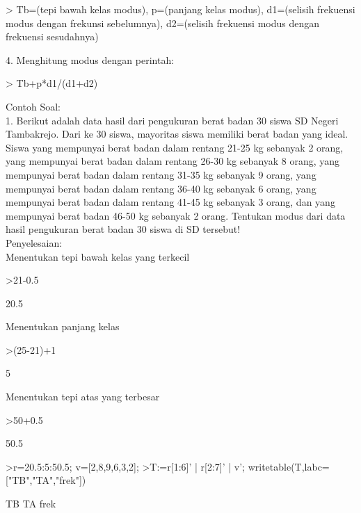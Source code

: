 \documentclass[a4paper,10pt]{article}
\begin{document}
\begin{eulernotebook}
\begin{eulercomment}
\textgreater{} Tb=(tepi bawah kelas modus), p=(panjang kelas modus), d1=(selisih
frekuensi modus dengan frekunsi sebelumnya), d2=(selisih frekuensi
modus dengan frekuensi sesudahnya)

4. Menghitung modus dengan perintah:

\textgreater{} Tb+p*d1/(d1+d2)

Contoh Soal:\\
1. Berikut adalah data hasil dari pengukuran berat badan 30 siswa SD
Negeri Tambakrejo. Dari ke 30 siswa, mayoritas siswa memiliki berat
badan yang ideal. Siswa yang mempunyai berat badan dalam rentang 21-25
kg sebanyak 2 orang, yang mempunyai berat badan dalam rentang 26-30 kg
sebanyak 8 orang, yang mempunyai berat badan dalam rentang 31-35 kg
sebanyak 9 orang, yang mempunyai berat badan dalam rentang 36-40 kg
sebanyak 6 orang, yang mempunyai berat badan dalam rentang 41-45 kg
sebanyak 3 orang, dan yang mempunyai berat badan 46-50 kg sebanyak 2
orang. Tentukan modus dari data hasil pengukuran berat badan 30 siswa
di SD tersebut!\\
Penyelesaian:\\
Menentukan tepi bawah kelas yang terkecil
\end{eulercomment}
\begin{eulerprompt}
>21-0.5
\end{eulerprompt}
\begin{euleroutput}
  20.5
\end{euleroutput}
\begin{eulercomment}
Menentukan panjang kelas
\end{eulercomment}
\begin{eulerprompt}
>(25-21)+1
\end{eulerprompt}
\begin{euleroutput}
  5
\end{euleroutput}
\begin{eulercomment}
Menentukan tepi atas yang terbesar
\end{eulercomment}
\begin{eulerprompt}
>50+0.5
\end{eulerprompt}
\begin{euleroutput}
  50.5
\end{euleroutput}
\begin{eulerprompt}
>r=20.5:5:50.5; v=[2,8,9,6,3,2];
>T:=r[1:6]' | r[2:7]' | v'; writetable(T,labc=["TB","TA","frek"])
\end{eulerprompt}
\begin{euleroutput}
          TB        TA      frek

\end{euleroutput}
\end{eulernotebook}
\end{document}
